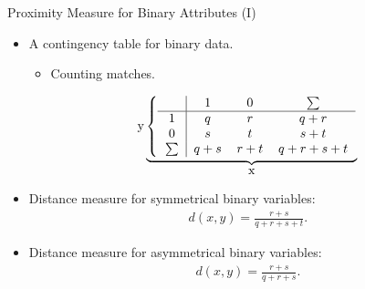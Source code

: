 \begin{frame}{Proximity Measure for Binary Attributes (I)}
	\begin{itemize}
		\item A contingency table for binary data.
		      \begin{itemize}
			      \item Counting matches.
		      \end{itemize}
		      \begin{center}
			      \vspace{-0.2cm}
			      \[
				      \text{y}\underbrace{
					      \left\{\begin{tabular}{ c | c c c }
						             & $1$   & $0$   & $\sum$    \\ \hline
						      $1$    & $q$   & $r$   & $q+r$     \\
						      $0$    & $s$   & $t$   & $s+t$     \\
						      $\sum$ & $q+s$ & $r+t$ & $q+r+s+t$
					      \end{tabular}\right.}_{\let\scriptstyle\textstyle\substack{\text{x}}}
			      \]
		      \end{center}
		\item Distance measure for symmetrical binary variables:
		      \begin{align}
			      d(x,y) = \frac{r+s}{q+r+s+t}.
		      \end{align}
		\item Distance measure for asymmetrical binary variables:
		      \begin{align}
			      d(x,y) = \frac{r+s}{q+r+s}.
		      \end{align}
	\end{itemize}
\end{frame}

